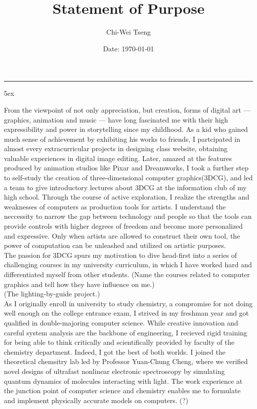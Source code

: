 \documentclass[a4paper, 12pt]{article}
\title{Statement of Purpose}
\author{Chi-Wei Tseng}
\date{Date: \today}
\makeatletter
\newcommand{\HRule}{\rule{\linewidth}{0.2mm}}
\renewcommand{\maketitle}{
  \parindent=0pt%
  \begin{flushleft}
  \bf \large{\@author}
  \HRule
  \end{flushleft}
  \begin{center}
    \MakeUppercase{\bf \@title}
  \end{center}%
    \par
}
\makeatother
\begin{document}
{\linespread{0.8} \maketitle}
\parindent 5ex

From the viewpoint of not only appreciation, but creation, forms of digital art --- graphics, animation and music --- have long fascinated me with their high expressibility and power in storytelling since my childhood. As a kid who gained much sense of achievement by exhibiting his works to friends, I partcipated in almost every extracurricular projects in designing class website, obtaining valuable experiences in digital image editing. Later, amazed at the features produced by animation studios like Pixar and Dreamworks, I took a further step to self-study the creation of three-dimensional computer graphics(3DCG), and led a team to give introductory lectures about 3DCG at the information club of my high school. Through the course of active exploration, I realize the strengths and weaknesses of computers as production tools for artists. I understand the neccessity to narrow the gap between technology and people so that the tools can provide controls with higher degrees of freedom and become more personalized and expressive. Only when artists are allowed to construct their own tool, the power of computation can be unleashed and utilized on artistic purposes.\\


The passion for 3DCG spurs my motivation to dive head-first into a series of challenging courses in my university curriculum, in which I have worked hard and differentiated myself from other students. (Name the courses related to computer graphics and tell how they have influence on me.)\\


(The lighting-by-guide project.)\\


As I originally enroll in university to study chemistry, a compromise for not doing well enough on the college entrance exam, I strived in my freshman year and got qualified in double-majoring computer science. While creative innovation and careful system analysis are the backbone of engineering, I recieved rigid training for being able to think critically and scientifically provided by faculty of the chemistry department. Indeed, I got the best of both worlds. I joined the theoretical chemsitry lab led by Professor Yuan-Chung Cheng, where we verified novel designs of ultrafast nonlinear electronic spectroscopy by simulating quantum dynamics of molecules interacting with light. The work experience at the junction point of computer science and chemistry enables me to formulate and implement physically accurate models on computers. (?)\\
 
\end{document}
